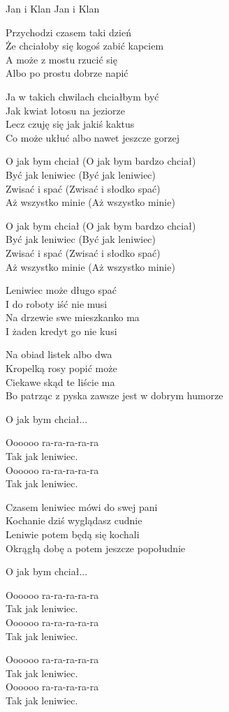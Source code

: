 {Jan i Klan}
{Jan i Klan}
\begin{text}
Przychodzi czasem taki dzień\\
Że chciałoby się kogoś zabić kapciem\\
A może z mostu rzucić się\\
Albo po prostu dobrze napić

Ja w takich chwilach chciałbym być\\
Jak kwiat lotosu na jeziorze\\
Lecz czuję się jak jakiś kaktus\\
Co może ukłuć albo nawet jeszcze gorzej

O jak bym chciał (O jak bym bardzo chciał)\\
Być jak leniwiec (Być jak leniwiec)\\
Zwisać i spać (Zwisać i słodko spać)\\
Aż wszystko minie (Aż wszystko minie)

O jak bym chciał (O jak bym bardzo chciał)\\
Być jak leniwiec (Być jak leniwiec)\\
Zwisać i spać (Zwisać i słodko spać)\\
Aż wszystko minie (Aż wszystko minie)

Leniwiec może długo spać\\
I do roboty iść nie musi\\
Na drzewie swe mieszkanko ma\\
I żaden kredyt go nie kusi

Na obiad listek albo dwa\\
Kropelką rosy popić może\\
Ciekawe skąd te liście ma\\
Bo patrząc z pyska zawsze jest w dobrym humorze

O jak bym chciał...

Oooooo ra-ra-ra-ra-ra\\
Tak jak leniwiec.\\
Oooooo ra-ra-ra-ra-ra\\
Tak jak leniwiec.

Czasem leniwiec mówi do swej pani\\
Kochanie dziś wyglądasz cudnie\\
Leniwie potem będą się kochali\\
Okrągłą dobę a potem jeszcze popołudnie

O jak bym chciał...

Oooooo ra-ra-ra-ra-ra\\
Tak jak leniwiec.\\
Oooooo ra-ra-ra-ra-ra\\
Tak jak leniwiec.

Oooooo ra-ra-ra-ra-ra\\
Tak jak leniwiec.\\
Oooooo ra-ra-ra-ra-ra\\
Tak jak leniwiec.
\end{text}
